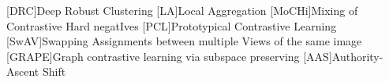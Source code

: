 \begin{acronym}

    [DRC]{Deep Robust Clustering}
    [LA]{Local Aggregation}
    [MoCHi]{Mixing of Contrastive Hard negatIves}
    [PCL]{Prototypical Contrastive Learning}
    [SwAV]{Swapping Assignments between multiple Views of the same image}
    [GRAPE]{Graph contrastive learning via subspace preserving}
    [AAS]{Authority-Ascent Shift}

\end{acronym}